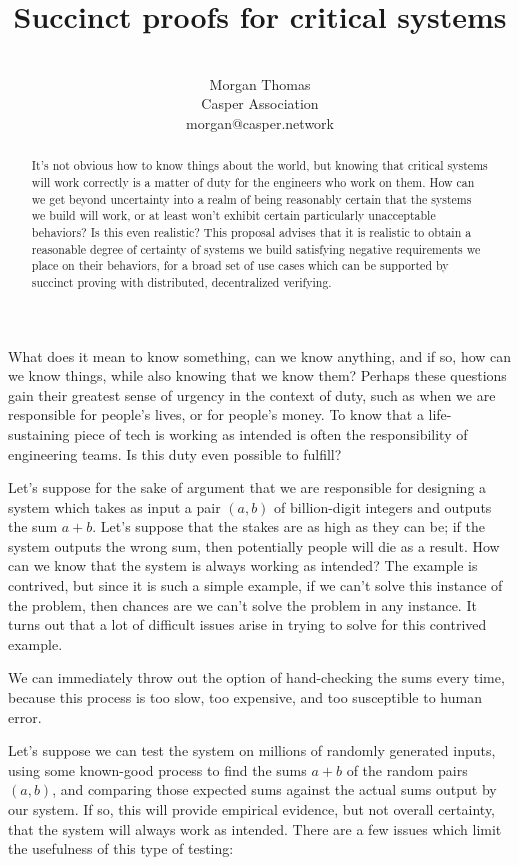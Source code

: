 \documentclass[11pt]{article}
\title{Succinct proofs for critical systems}
\author{ \\ Morgan Thomas \\ Casper Association \\ morgan@casper.network }
\begin{document}
\maketitle

\begin{abstract}
	It's not obvious how to know things about the world, but knowing that
	critical systems will work correctly is a matter of duty for the
	engineers who work on them. How can we get beyond uncertainty into a
	realm of being reasonably certain that the systems we build will work,
	or at least won't exhibit certain particularly unacceptable behaviors? 
	Is this even realistic? This proposal advises that it is realistic to
	obtain a reasonable degree of certainty of systems we build
	satisfying negative requirements we place on their behaviors, for
	a broad set of use cases which can be supported by succinct proving
	with distributed, decentralized verifying.
\end{abstract}

What does it mean to know something, can we know anything, and if so, how
can we know things, while also knowing that we know them? Perhaps these questions
gain their greatest sense of urgency in the context of duty, such as when we are
responsible for people's lives, or for people's money. To know that a life-sustaining
piece of tech is working as intended is often the responsibility of engineering teams.
Is this duty even possible to fulfill?

Let's suppose for the sake of argument that we are responsible for designing a system
which takes as input a pair $(a,b)$  of billion-digit integers and outputs the sum $a + b$.
Let's suppose that the stakes are as high as they can be; if the system outputs the wrong
sum, then potentially people will die as a result. How can we know that the system is always
working as intended? The example is contrived, but since it is such a simple example,
if we can't solve this instance of the problem, then chances are we can't solve the problem
in any instance. It turns out that a lot of difficult issues arise in trying to solve
for this contrived example.

We can immediately throw out the option of hand-checking the sums every time,
because this process is too slow, too expensive, and too susceptible to human error.

Let's suppose we can test the system on millions of randomly generated inputs, using
some known-good process to find the sums $a + b$ of the random pairs $(a, b)$, and
comparing those expected sums against the actual sums output by our system. If so,
this will provide empirical evidence, but not overall certainty, that the system will always
work as intended. There are a few issues which limit the usefulness of this type of testing:
\end{document}
